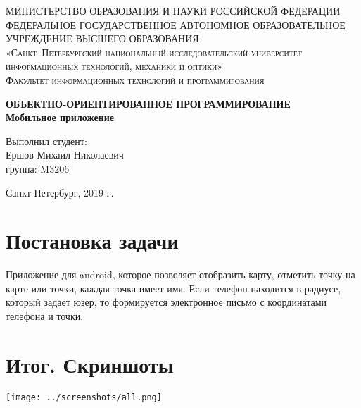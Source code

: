 \documentclass{article}
\begin{document}
\begin{titlepage}
    \begin{center}
    \textsc{МИНИСТЕРСТВО ОБРАЗОВАНИЯ И НАУКИ РОССИЙСКОЙ ФЕДЕРАЦИИ ФЕДЕРАЛЬНОЕ ГОСУДАРСТВЕННОЕ АВТОНОМНОЕ ОБРАЗОВАТЕЛЬНОЕ УЧРЕЖДЕНИЕ ВЫСШЕГО ОБРАЗОВАНИЯ\\[5mm]
    «Санкт–Петербургский национальный исследовательский университет информационных технологий, механики и оптики»\\[20mm]
    Факультет информационных технологий и программирования\\[5mm]
    }
    \vfill
    
    \textbf{ОБЪЕКТНО-ОРИЕНТИРОВАННОЕ ПРОГРАММИРОВАНИЕ\\[2mm]}
    \textbf{Мобильное приложение\\[20mm]}
    \end{center}
    
    \hfill
    \begin{minipage}{.3\textwidth}
    Выполнил студент:\\[2mm] 
    Ершов Михаил Николаевич \\
    группа: M3206\\[5mm]
    \end{minipage}%
    \vfill
    \begin{center}
    Санкт-Петербург, 2019 г.
    \end{center}
    \end{titlepage}

    \section{Постановка задачи}
    Приложение для android, которое позволяет отобразить карту, отметить точку на карте или точки, каждая точка имеет имя.
    Если телефон находится в радиусе, который задает юзер, то формируется электронное письмо с координатами телефона и точки.
    \section{Итог. Скриншоты}
    \texttt{[image: ../screenshots/all.png]}
\end{document}
